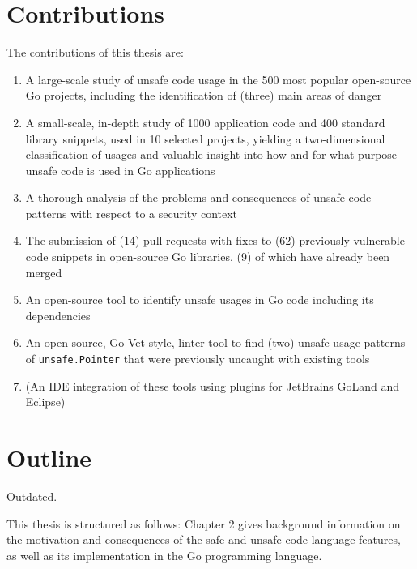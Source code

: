
\section{Contributions}\label{sec:contributions}

The contributions of this thesis are:

\begin{enumerate}
    \item A large-scale study of unsafe code usage in the 500 most popular open-source Go projects,
    including the identification of (three) main areas of danger
    \item A small-scale, in-depth study of 1000 application code and 400 standard library snippets, used in 10
    selected projects, yielding a two-dimensional classification of usages and valuable insight into how and for what
    purpose unsafe code is used in Go applications
    \item A thorough analysis of the problems and consequences of unsafe code patterns with respect to a security
    context
    \item The submission of (14) pull requests with fixes to (62) previously vulnerable code snippets in open-source Go
    libraries, (9) of which have already been merged
    \item An open-source tool to identify unsafe usages in Go code including its dependencies
    \item An open-source, Go Vet-style, linter tool to find (two) unsafe usage patterns of \texttt{unsafe.Pointer}
    that were previously uncaught with existing tools
    \item (An IDE integration of these tools using plugins for JetBrains GoLand and Eclipse)
\end{enumerate}




\section{Outline}\label{sec:outline}

Outdated.

This thesis is structured as follows: Chapter 2 gives background information on the motivation
and consequences of the safe and unsafe code language features, as well as its implementation
in the Go programming language.

